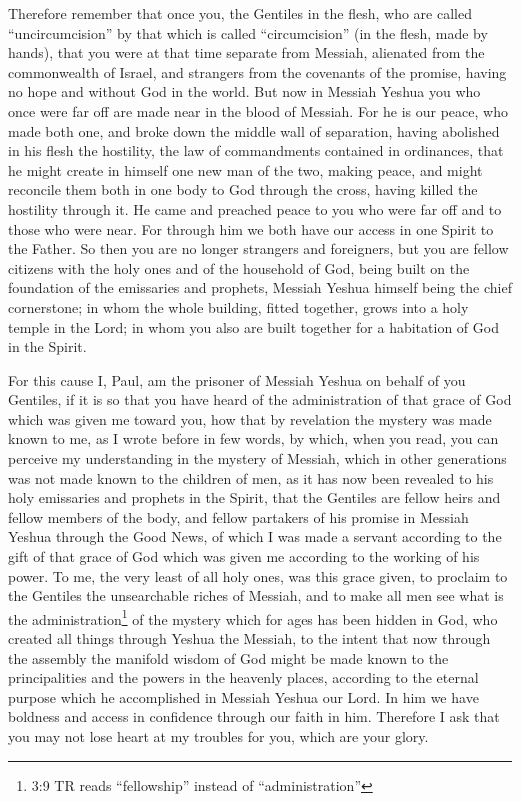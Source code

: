 \myverse{}Therefore remember that once you, the Gentiles in the flesh,
who are called “uncircumcision” by that which is called “circumcision” (in the flesh, made by hands),
\myverse{}that you were at that time separate from Messiah, alienated from the commonwealth
of Israel, and strangers from the covenants of the promise, having no hope and without God in the world.
\myverse{}But now in Messiah Yeshua you who once were far off are made near in the blood
of Messiah.
\myverse{}For he is our peace, who made both one, and broke down the middle wall of
separation,
\myverse{}having abolished in his flesh the hostility, the law of commandments contained
in ordinances, that he might create in himself one new man of the two, making peace,
\myverse{}and might reconcile them both in one body to God through the cross, having
killed the hostility through it.
\myverse{}He came and preached peace to you who were far off and to those who were near.
\myverse{}For through him we both have our access in one Spirit to the Father.
\myverse{}So then you are no longer strangers and foreigners, but you are fellow citizens
with the holy ones and of the household of God,
\myverse{}being built on the foundation of the emissaries and prophets, Messiah Yeshua
himself being the chief cornerstone;
\myverse{}in whom the whole building, fitted together, grows into a holy temple in the
Lord;
\myverse{}in whom you also are built together for a habitation of God in the Spirit.


\mychapter{} \myverse*{}For this cause I, Paul, am the prisoner of Messiah Yeshua on behalf
of you Gentiles,
\myverse{}if it is so that you have heard of the administration of that grace of God which
was given me toward you,
\myverse{}how that by revelation the mystery was made known to me, as I wrote before in
few words,
\myverse{}by which, when you read, you can perceive my understanding in the mystery of
Messiah,
\myverse{}which in other generations was not made known to the children of men, as it
has now been revealed to his holy emissaries and prophets in the Spirit,
\myverse{}that the Gentiles are fellow heirs and fellow members of the body, and fellow
partakers of his promise in Messiah Yeshua through the Good News,
\myverse{}of which I was made a servant according to the gift of that grace of God which
was given me according to the working of his power.
\myverse{}To me, the very least of all holy ones, was this grace given, to proclaim to
the Gentiles the unsearchable riches of Messiah,
\myverse{}and to make all men see what is the administration\footnote{3:9 TR reads “fellowship” instead of “administration”} of the mystery which for ages has
been hidden in God, who created all things through Yeshua the Messiah,
\myverse{}to the intent that now through the assembly the manifold wisdom of God might
be made known to the principalities and the powers in the heavenly places,
\myverse{}according to the eternal purpose which he accomplished in Messiah Yeshua our
Lord.
\myverse{}In him we have boldness and access in confidence through our faith in him.
\myverse{}Therefore I ask that you may not lose heart at my troubles for you, which
are your glory.

